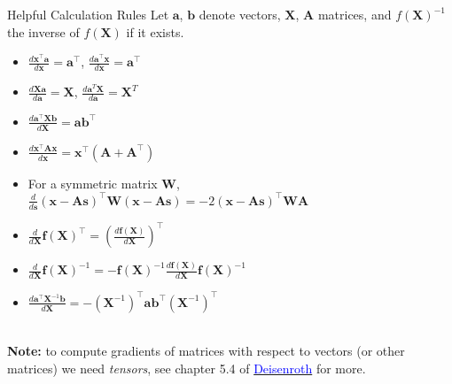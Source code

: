 \documentclass[11pt,compress,t,notes=noshow, xcolor=table]{beamer}
\newcommand{\deriv}{d}
\begin{document}
\begin{vbframe}{Helpful Calculation Rules}
Let $\boldsymbol{a}$, $\boldsymbol{b}$ denote vectors, $\boldsymbol{X}$, $\boldsymbol{A}$ matrices, and $f(\boldsymbol{X})^{-1}$ the inverse of $f(\boldsymbol{X})$ if it exists. 
 \begin{itemize}
    \item $ \frac{\deriv \boldsymbol{x}^{\top} \boldsymbol{a}}{\deriv \boldsymbol{x}}=\boldsymbol{a}^{\top}$, $\frac{\deriv \boldsymbol{a}^{\top} \boldsymbol{x}}{\deriv \boldsymbol{x}}=\boldsymbol{a}^{\top}$
    \item $\frac{\deriv\boldsymbol{X}\boldsymbol{a}}{\deriv\boldsymbol{a}} = \boldsymbol{X}$, $\frac{\deriv\boldsymbol{a}^T\boldsymbol{X}}{\deriv\boldsymbol{a}} = \boldsymbol{X}^T$
    \item $\frac{\deriv \boldsymbol{a}^{\top} \boldsymbol{X} \boldsymbol{b}}{\deriv \boldsymbol{X}}=\boldsymbol{a} \boldsymbol{b}^{\top}$
    \item $\frac{\deriv \boldsymbol{x}^{\top} \boldsymbol{A} \boldsymbol{x}}{\deriv \boldsymbol{x}}=\boldsymbol{x}^{\top}\left(\boldsymbol{A}+\boldsymbol{A}^{\top}\right)$
    \item For a symmetric matrix $\boldsymbol{W}$, $\frac{\deriv}{\deriv \boldsymbol{s}}(\boldsymbol{x}-\boldsymbol{A} \boldsymbol{s})^{\top} \boldsymbol{W}(\boldsymbol{x}-\boldsymbol{A} \boldsymbol{s})=-2(\boldsymbol{x}-\boldsymbol{A} \boldsymbol{s})^{\top} \boldsymbol{W} \boldsymbol{A}$
    \item $\frac{\deriv}{\deriv \boldsymbol{X}} \boldsymbol{f}(\boldsymbol{X})^{\top}=\left(\frac{\deriv \boldsymbol{f}(\boldsymbol{X})}{\deriv \boldsymbol{X}}\right)^{\top}$
    \item $\frac{\deriv}{\deriv \boldsymbol{X}} \boldsymbol{f}(\boldsymbol{X})^{-1}=-\boldsymbol{f}(\boldsymbol{X})^{-1} \frac{\deriv \boldsymbol{f}(\boldsymbol{X})}{\deriv \boldsymbol{X}} \boldsymbol{f}(\boldsymbol{X})^{-1}$
    \item $\frac{\deriv \boldsymbol{a}^{\top} \boldsymbol{X}^{-1} \boldsymbol{b}}{\deriv \boldsymbol{X}}=-\left(\boldsymbol{X}^{-1}\right)^{\top} \boldsymbol{a} \boldsymbol{b}^{\top}\left(\boldsymbol{X}^{-1}\right)^{\top}$
    \end{itemize}  \,\\
    {\small\textbf{Note:} to compute  gradients of matrices
with respect to vectors (or other matrices) we need \emph{tensors}, see chapter 5.4 of \href{https://mml-book.github.io/book/mml-book.pdf}{\textcolor{blue}{Deisenroth}} for more.}
\end{vbframe}
\end{document}
